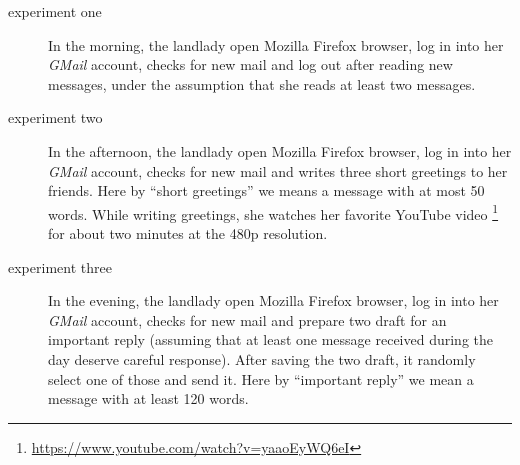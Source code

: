 \documentclass[10pt,a4paper]{article}
\begin{document}
    \begin{description}
    \item[experiment one] In the morning, the landlady open Mozilla
      Firefox browser, log in into her \emph{GMail} account, checks for
      new mail and log out after reading new messages, under the
      assumption that she reads at least two messages.
    \item[experiment two] In the afternoon, the landlady open Mozilla
      Firefox browser, log in into her \emph{GMail} account, checks
      for new mail and writes three short greetings to her
      friends. Here by ``short greetings'' we means a message with at
      most 50 words.  While writing greetings, she watches her
      favorite YouTube video
      \footnote{\url{https://www.youtube.com/watch?v=yaaoEyWQ6eI}} for
      about two minutes at the 480p resolution.
    \item[experiment three] In the evening, the landlady open Mozilla
      Firefox browser, log in into her \emph{GMail} account, checks for
      new mail and prepare two draft for an important reply (assuming
      that at least one message received during the day deserve
      careful response). After saving the two draft, it randomly
      select one of those and send it. Here by ``important reply'' we
      mean a message with at least 120 words.
    \end{description}
\end{document}
